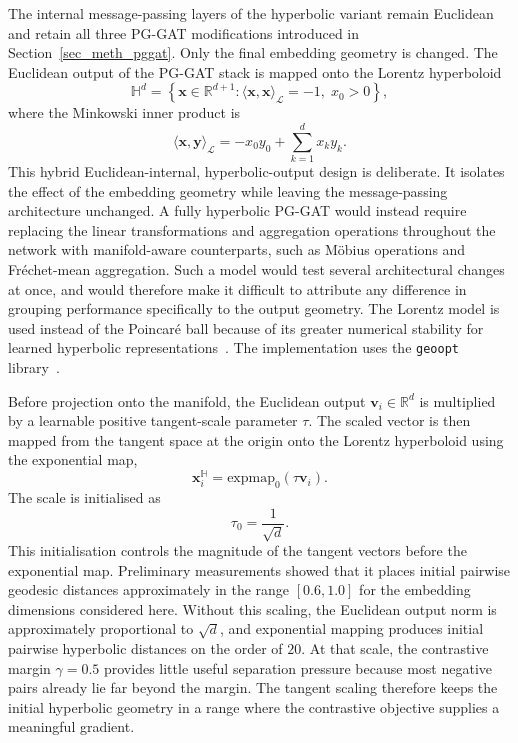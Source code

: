 The internal message-passing layers of the hyperbolic variant remain
Euclidean and retain all three PG-GAT modifications introduced in
Section~\ref{sec_meth_pggat}.
Only the final embedding geometry is changed.
The Euclidean output of the PG-GAT stack is mapped onto the
Lorentz hyperboloid
\begin{equation}
    \mathbb{H}^{d}
    =
    \left\{
        \mathbf{x}\in\mathbb{R}^{d+1}
        :
        \langle\mathbf{x},\mathbf{x}\rangle_{\mathcal{L}}=-1,\;
        x_0>0
    \right\},
    \label{eq:hyperbolic_manifold}
\end{equation}
where the Minkowski inner product is
\begin{equation}
    \langle\mathbf{x},\mathbf{y}\rangle_{\mathcal{L}}
    =
    -x_0y_0+\sum_{k=1}^{d}x_ky_k.
\end{equation}
This hybrid Euclidean-internal, hyperbolic-output design is deliberate.
It isolates the effect of the embedding geometry
while leaving the message-passing architecture unchanged.
A fully hyperbolic PG-GAT would instead require replacing
the linear transformations and aggregation operations
throughout the network with manifold-aware counterparts,
such as M\"obius operations and Fr\'echet-mean aggregation.
Such a model would test several architectural changes at once,
and would therefore make it difficult to attribute any difference
in grouping performance specifically to the output geometry.
The Lorentz model is used instead of the Poincar\'e ball
because of its greater numerical stability
for learned hyperbolic representations~\cite{nickel2018lorentz}.
The implementation uses the \texttt{geoopt} library~\cite{kochurov2020geoopt}.

Before projection onto the manifold,
the Euclidean output $\mathbf{v}_i\in\mathbb{R}^{d}$
is multiplied by a learnable positive tangent-scale parameter $\tau$.
The scaled vector is then mapped from the tangent space at the origin
onto the Lorentz hyperboloid using the exponential map,
\begin{equation}
    \mathbf{x}^{\mathbb{H}}_i
    =
    \mathrm{expmap}_{0}
    \!\left(
        \tau\mathbf{v}_i
    \right).
    \label{eq:hyperbolic_expmap}
\end{equation}
The scale is initialised as
\begin{equation}
    \tau_0=\frac{1}{\sqrt{d}}.
\end{equation}
This initialisation controls the magnitude of the tangent vectors before
the exponential map.
Preliminary measurements showed that it places initial pairwise
geodesic distances approximately in the range $[0.6,1.0]$
for the embedding dimensions considered here.
Without this scaling,
the Euclidean output norm is approximately proportional to $\sqrt{d}$,
and exponential mapping produces initial pairwise hyperbolic distances
on the order of $20$.
At that scale,
the contrastive margin $\gamma=0.5$ provides little useful separation
pressure because most negative pairs already lie far beyond the margin.
The tangent scaling therefore keeps the initial hyperbolic geometry
in a range where the contrastive objective supplies a meaningful gradient.

